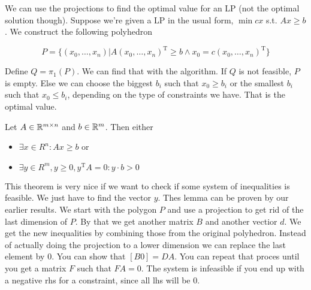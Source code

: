 We can use the projections to find the optimal value for an LP (not the optimal solution though). Suppose we're given a LP in the usual form, $\min cx$ s.t. $Ax\geq b$. We construct the following polyhedron

\[P=\{(x_0,\ldots,x_n) | A(x_0,\ldots,x_n)^{\mbox{T}} \geq b \wedge x_0=c(x_0,\ldots,x_n)^{\mbox{T}}\}\]

Define $Q = \pi_1(P)$. We can  find that with the algorithm. If $Q$ is not feasible, $P$ is empty. Else we can choose the biggest $b_i$ such that $x_0\geq b_i$ or the smallest $b_i$ such that $x_0 \leq b_i$, depending on the type of constraints we have. That is the optimal value.

\begin{thm} Let $A\in \mathbb{R}^{m\times n}$ and $b\in \mathbb{R}^m$. Then either 
\begin{itemize}
\item $\exists x\in R^n: Ax\geq b$ or
\item $\exists y\in R^m, y\geq 0, y^{\mbox{T}}A=0: y\cdot b>0$
\end{itemize}
\end{thm}

This theorem is very nice if we want to check if some system of inequalities is feasible. We just have to find the vector $y$. Thes lemma can be proven by our earlier results. We start with the polygon $P$ and use a projection to get rid of the last dimension of $P$. By that we get another matrix $B$ and another vectior $d$. We get the new inequalities by combining those from the original polyhedron. Instead of actually doing the projection to a lower dimension we can replace the last element by 0. You can show that $[B0]=DA$. You can repeat that proces until you get a matrix $F$ such that $FA=0$. The system is infeasible if you end up with a negative rhs for a constraint, since all lhs will be 0.